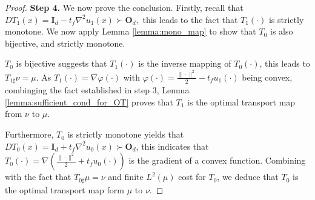 \documentclass{article} %
\theoremstyle{plain}
\theoremstyle{definition}
\theoremstyle{remark}
\begin{document}
\begin{proof}
\textbf{Step 4.} We now prove the conclusion. Firstly, recall that $D T_1(x) = \textbf{I}_d - t_f\nabla^2 u_1(x) \succ \textbf{O}_d,$ this leads to the fact that $T_1(\cdot)$ is strictly monotone. We now apply Lemma \ref{lemma:mono_map} to show that $T_0$ is also bijective, and strictly monotone. 

$T_0$ is bijective suggests that $T_1(\cdot)$ is the inverse mapping of $T_0(\cdot)$, this leads to $T_{1\sharp}\nu = \mu$. As $T_1(\cdot)=\nabla\varphi(\cdot)$ with $\varphi(\cdot) = \frac{\|\cdot\|^2}{2} - t_f u_1(\cdot)$ being convex, combinging the fact established in step 3, Lemma \ref{lemma:sufficient_cond_for_OT} proves that $T_1$ is the optimal transport map from $\nu$ to $\mu$. 

Furthermore, $T_0$ is strictly monotone yields that $DT_0(x) = \textbf{I}_d + t_f\nabla^2 u_0(x)\succ \textbf{O}_d$, this indicates that $T_0(\cdot)=\nabla\left(\frac{\|\cdot\|^2}{2} + t_f u_0(\cdot)\right)$ is the gradient of a convex function. Combining with the fact that $T_{0\sharp}\mu = \nu$ and finite $L^2(\mu)$ cost for $T_0$, we deduce that $T_0$ is the optimal transport map form $\mu$ to $\nu$.
\end{proof}
\end{document}
